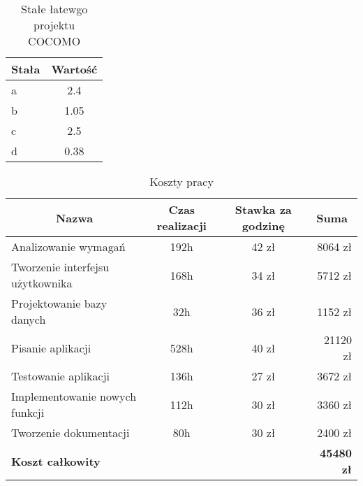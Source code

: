 \begin{table}[ht]
\begin{center}
\caption{Stałe łatewgo projektu COCOMO}
\begin{tabular}{| l | c |}
    \hline
		Stała & Wartość \\
	\hline
		a & 2.4 \\
	\hline
		b & 1.05 \\
	\hline
		c & 2.5 \\
	\hline
		d & 0.38 \\
    \hline

 \end{tabular}
 \end{center}
 \end{table}

  \begin{table}[ht]
  \begin{center}
  \caption{Koszty pracy}
  \begin{tabular}{| l | c | c | r |}
    \hline
      \multicolumn{1}{|c|}{Nazwa} & \multicolumn{1}{|c|}{Czas realizacji} & \multicolumn{1}{|c|}{Stawka za godzinę} & \multicolumn{1}{|c|}{Suma} \\
    \hline
      Analizowanie wymagań & 192h & 42 zł & 8064 zł \\
    \hline
      Tworzenie interfejsu użytkownika & 168h  & 34 zł & 5712 zł \\
    \hline
      Projektowanie bazy danych & 32h & 36 zł & 1152 zł \\
    \hline
      Pisanie aplikacji & 528h  & 40 zł & 21120 zł \\
    \hline
      Testowanie aplikacji & 136h & 27 zł & 3672 zł \\
    \hline
      Implementowanie nowych funkcji & 112h & 30 zł & 3360 zł \\
    \hline
      Tworzenie dokumentacji & 80h & 30 zł & 2400 zł \\
    \hline
      \multicolumn{3}{|l}{\textbf{Koszt całkowity}} & \textbf{45480 zł} \\
    \hline
  \end{tabular}
  \end{center}
  \end{table}

